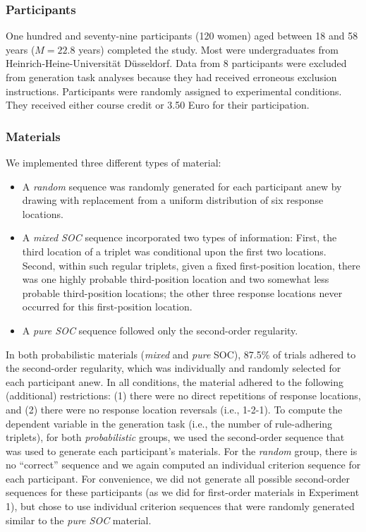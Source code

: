 \documentclass[floatsintext,man]{apa6}
\providecommand{\tightlist}{%
  \setlength{\itemsep}{0pt}\setlength{\parskip}{0pt}}
\begin{document}
\subsubsection{Participants}\label{participants-1}

One hundred and seventy-nine participants (120 women) aged between 18
and 58 years (\(M = 22.8\) years) completed the study. Most were
undergraduates from Heinrich-Heine-Universität Düsseldorf. Data from 8
participants were excluded from generation task analyses because they
had received erroneous exclusion instructions. Participants were
randomly assigned to experimental conditions. They received either
course credit or 3.50 Euro for their participation.

\subsubsection{Materials}\label{materials-1}

We implemented three different types of material:

\begin{itemize}
\tightlist
\item
  A \emph{random} sequence was randomly generated for each participant
  anew by drawing with replacement from a uniform distribution of six
  response locations.
\item
  A \emph{mixed SOC} sequence incorporated two types of information:
  First, the third location of a triplet was conditional upon the first
  two locations. Second, within such regular triplets, given a fixed
  first-position location, there was one highly probable third-position
  location and two somewhat less probable third-position locations; the
  other three response locations never occurred for this first-position
  location.
\item
  A \emph{pure SOC} sequence followed only the second-order regularity.
\end{itemize}

In both probabilistic materials (\emph{mixed} and \emph{pure} SOC),
87.5\% of trials adhered to the second-order regularity, which was
individually and randomly selected for each participant anew. In all
conditions, the material adhered to the following (additional)
restrictions: (1) there were no direct repetitions of response
locations, and (2) there were no response location reversals (i.e.,
1-2-1). To compute the dependent variable in the generation task (i.e.,
the number of rule-adhering triplets), for both \emph{probabilistic}
groups, we used the second-order sequence that was used to generate each
participant's materials. For the \emph{random} group, there is no
\enquote{correct} sequence and we again computed an individual criterion
sequence for each participant. For convenience, we did not generate all
possible second-order sequences for these participants (as we did for
first-order materials in Experiment 1), but chose to use individual
criterion sequences that were randomly generated similar to the
\emph{pure SOC} material.
\end{document}
